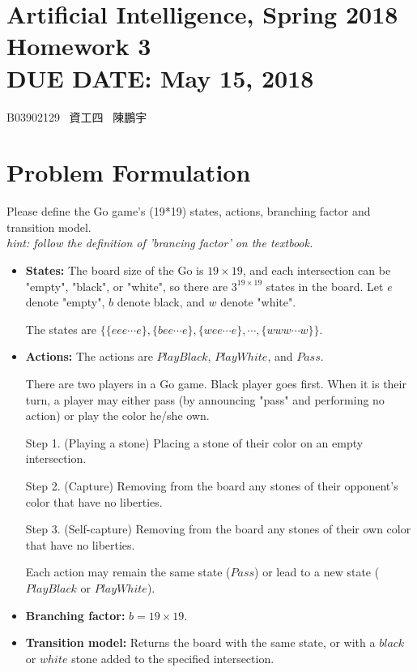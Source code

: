 \documentclass{article}
\newcommand{\hmwkClass}{Artificial Intelligence, Spring 2018}
\newcommand{\hmwkTitle}{Homework 3}
\newcommand{\hmwkDueDate}{May 15, 2018}
\newcommand{\tb}{\textbf}
\begin{document}
\thispagestyle{empty}
\section*{\hmwkClass \\
    \normalsize{\hmwkTitle} \\
    \normalsize{DUE DATE: \hmwkDueDate}
}

\hfill{B03902129 \, 資工四 \, 陳鵬宇}

\section{Problem Formulation}

Please define the Go game's (19*19) states, actions, branching factor and transition model. \\
\textit{hint: follow the definition of 'brancing factor' on the textbook.}

\begin{itemize}
    \item \tb{States:} The board size of the Go is $19 \times 19$, and each intersection can be "empty", "black", or "white", so there are $3^{19 \times 19}$ states in the board. Let $e$ denote "empty", $b$ denote black, and $w$ denote "white".

        The states are $\{\{eee \cdots e\}, \{bee \cdots e\}, \{wee \cdots e\}, \cdots, \{www \cdots w\}\}$.

    \item \tb{Actions:} 
    The actions are $PlayBlack$, $PlayWhite$, and $Pass$.

    There are two players in a Go game. Black player goes first. When it is their turn, a player may either pass (by announcing "pass" and performing no action) or play the color he/she own.
    
    Step 1. (Playing a stone) Placing a stone of their color on an empty intersection.

    Step 2. (Capture) Removing from the board any stones of their opponent's color that have no liberties.

    Step 3. (Self-capture) Removing from the board any stones of their own color that have no liberties.

    Each action may remain the same state ($Pass$) or lead to a new state ($PlayBlack$ or $PlayWhite$).

    \item \tb{Branching factor:} $b = 19 \times 19$.

    \item \tb{Transition model:} Returns the board with the same state, or with a $black$ or $white$ stone added to the specified intersection.

\end{itemize}
\end{document}
